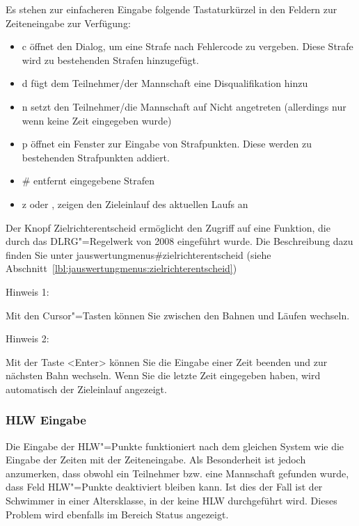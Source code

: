 \documentclass[11pt,a4paper,twoside,ngerman]{article}
\begin{document}
Es stehen zur einfacheren Eingabe folgende Tastaturkürzel in den Feldern zur Zeiteneingabe zur Verfügung:
\begin{itemize}

\item \glqq{}c\grqq{} öffnet den Dialog, um eine Strafe nach Fehlercode zu vergeben. Diese Strafe wird zu bestehenden Strafen hinzugefügt.


\item \glqq{}d\grqq{} fügt dem Teilnehmer/der Mannschaft eine \glqq{}Disqualifikation\grqq{} hinzu


\item \glqq{}n\grqq{} setzt den Teilnehmer/die Mannschaft auf \glqq{}Nicht angetreten\grqq{} (allerdings nur wenn keine Zeit eingegeben wurde)


\item \glqq{}p\grqq{} öffnet ein Fenster zur Eingabe von Strafpunkten. Diese werden zu bestehenden Strafpunkten addiert.


\item \glqq{}\#\grqq{} entfernt eingegebene Strafen


\item \glqq{}z\grqq{} oder \glqq{},\grqq{} zeigen den Zieleinlauf des aktuellen Laufs an


\end{itemize}


Der Knopf \glqq{}Zielrichterentscheid\grqq{} ermöglicht den Zugriff auf eine Funktion, die durch das DLRG"=Regelwerk von 2008 eingeführt wurde. Die Beschreibung dazu finden Sie unter jauswertungmenus\#zielrichterentscheid (siehe Abschnitt~\ref{lbl:jauswertungmenus:zielrichterentscheid})

\begin{bfseries}Hinweis 1:\end{bfseries} Mit den Cursor"=Tasten können Sie zwischen den Bahnen und Läufen wechseln.

\begin{bfseries}Hinweis 2:\end{bfseries} Mit der Taste \textless{}Enter\textgreater{} können Sie die Eingabe einer Zeit beenden und zur nächsten Bahn wechseln. Wenn Sie die letzte Zeit eingegeben haben, wird automatisch der Zieleinlauf angezeigt.


\subsubsection*{HLW Eingabe}
Die Eingabe der HLW"=Punkte funktioniert nach dem gleichen System wie die Eingabe der Zeiten mit der \glqq{}Zeiteneingabe\grqq{}. Als Besonderheit ist jedoch anzumerken, dass obwohl ein Teilnehmer bzw. eine Mannschaft gefunden wurde, dass Feld \glqq{}HLW"=Punkte\grqq{} deaktiviert bleiben kann. Ist dies der Fall ist der Schwimmer in einer Altersklasse, in der keine HLW durchgeführt wird. Dieses Problem wird ebenfalls im Bereich \glqq{}Status\grqq{} angezeigt.
\end{document}
